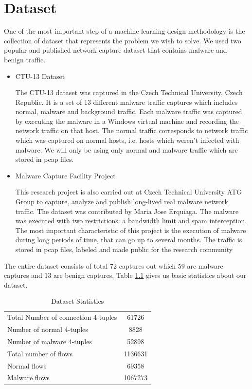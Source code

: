 \chapter{Dataset\label{chap:dataset}}

One of the most important step of a machine learning design methodology is the collection of dataset that represents the problem we wish to solve. We used two popular and published network capture dataset that contains malware and benign traffic.

\begin{itemize}
	\item CTU-13 Dataset \cite{GarciaGSZ14}
	
	The CTU-13 dataset was captured in the Czech Technical University, Czech Republic. It is a set of 13 different malware traffic captures which includes normal, malware and background traffic. Each malware traffic was captured by executing the malware in a Windows virtual machine and recording the network traffic on that host. The normal traffic corresponds to network traffic which was captured on normal hosts, i.e. hosts which weren't infected with malware. We will only be using only normal and malware traffic which are stored in pcap files. 
	
	\item Malware Capture Facility Project \cite{Erquiaga15}
	
	This research project is also carried out at Czech Technical University ATG Group to capture, analyze and publish long-lived real malware network traffic. The dataset was contributed by Maria Jose Erquiaga. The malware was executed with two restrictions: a bandwidth limit and spam interception. The most important characteristic of this project is the execution of malware during long periods of time, that can go up to several months. The traffic is stored in pcap files, labeled and made public for the research community
	
\end{itemize}

The entire dataset consists of total 72 captures out which 59 are malware captures and 13 are benign captures. Table \ref{tab:1} gives us basic statistics about our dataset.

\begin{table}[!htb]
	\caption{Dataset Statistics\label{tab:1}}
	\begin{center}
		\begin{tabular}{p{}|c}\hline\hline
			Total Number of connection 4-tuples & 61726 \\
			Number of normal 4-tuples & 8828 \\
			Number of malware 4-tuples & 52898 \\
			Total number of flows & 1136631\\
			Normal flows & 69358\\
			Malware flows & 1067273\\
			\hline\hline
		\end{tabular}
	\end{center}
\end{table}

